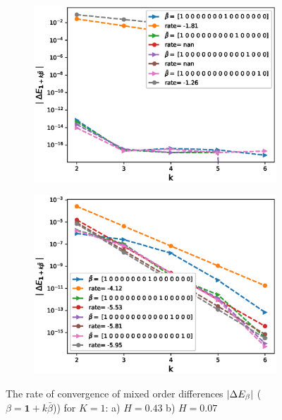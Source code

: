 \documentclass[11pt]{article}
\begin{document}
\begin{figure}[h!]
	\centering
	\begin{subfigure}{.5\textwidth}
		\centering
		\includegraphics[width=1\linewidth]{./figures/effect_H_differences/non_hierarchical/H_043/N_8/mixed_difference_order2_rbergomi_8steps_H_043_K_1_non_hierarch_with_rate_W2}
		\caption{}
		\label{fig:sub3}
	\end{subfigure}%
	\begin{subfigure}{.5\textwidth}
		\centering
		\includegraphics[width=1\linewidth]{./figures/effect_H_differences/non_hierarchical/H_007/N_8/mixed_difference_order2_rbergomi_8steps_H_007_K_1_non_hierarch_with_rate_W2}
		\caption{}
		\label{fig:sub4}
	\end{subfigure}
	
	\caption{The rate of convergence of  mixed order differences $\left\lvert\Delta E_{\beta}\right\rvert$ ($\beta=\mathbf{1}+k \bar{\beta}$)) for $K=1$: a) $H=0.43$ b)  $H=0.07$}
	\label{fig:test2}
\end{figure}
\newpage
\end{document}
